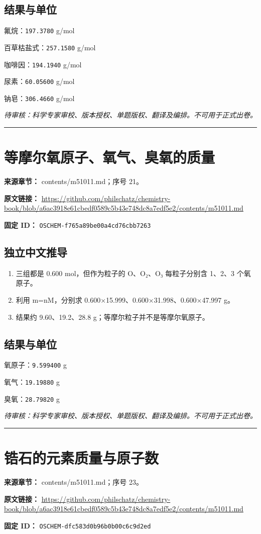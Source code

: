 \documentclass[UTF8,11pt,oneside,openany,fontset=none]{ctexbook}
\begin{document}
\subsection*{结果与单位}
\noindent 氟烷：\texttt{197.3780} g/mol\par
\noindent 百草枯盐式：\texttt{257.1580} g/mol\par
\noindent 咖啡因：\texttt{194.1940} g/mol\par
\noindent 尿素：\texttt{60.05600} g/mol\par
\noindent 钠皂：\texttt{306.4660} g/mol\par
\noindent\textit{待审核：科学专家审校、版本授权、单题版权、翻译及编排。不可用于正式出卷。}
\medskip\hrule\medskip
\section{等摩尔氧原子、氧气、臭氧的质量}
\noindent\textbf{来源章节：} contents/m51011.md；序号 21。\par
\noindent\textbf{原文链接：} \url{https://github.com/philschatz/chemistry-book/blob/a6ac3918e61cbedf0589c5b43e748dc8a7edf5e2/contents/m51011.md}\par
\noindent\textbf{固定 ID：} \texttt{OSCHEM-f765a89be00a4cd76cbb7263}\par
\subsection*{独立中文推导}
\begin{enumerate}
\item 三组都是 0.600 mol，但作为粒子的 O、O₂、O₃ 每粒子分别含 1、2、3 个氧原子。
\item 利用 m=nM，分别求 0.600×15.999、0.600×31.998、0.600×47.997 g。
\item 结果约 9.60、19.2、28.8 g；等摩尔粒子并不是等摩尔氧原子。
\end{enumerate}
\subsection*{结果与单位}
\noindent 氧原子：\texttt{9.599400} g\par
\noindent 氧气：\texttt{19.19880} g\par
\noindent 臭氧：\texttt{28.79820} g\par
\noindent\textit{待审核：科学专家审校、版本授权、单题版权、翻译及编排。不可用于正式出卷。}
\medskip\hrule\medskip
\section{锆石的元素质量与原子数}
\noindent\textbf{来源章节：} contents/m51011.md；序号 23。\par
\noindent\textbf{原文链接：} \url{https://github.com/philschatz/chemistry-book/blob/a6ac3918e61cbedf0589c5b43e748dc8a7edf5e2/contents/m51011.md}\par
\noindent\textbf{固定 ID：} \texttt{OSCHEM-dfc583d0b96b0b00c6c9d2ed}\par
\end{document}
